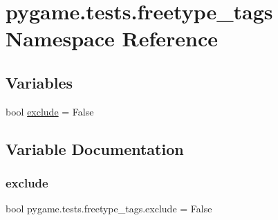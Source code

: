 \hypertarget{namespacepygame_1_1tests_1_1freetype__tags}{}\section{pygame.\+tests.\+freetype\+\_\+tags Namespace Reference}
\label{namespacepygame_1_1tests_1_1freetype__tags}
\subsection*{Variables}
\begin{DoxyCompactItemize}
\item 
bool \hyperlink{namespacepygame_1_1tests_1_1freetype__tags_a9805ff14999bba1c04d6a03278794226}{exclude} = False
\end{DoxyCompactItemize}


\subsection{Variable Documentation}
\mbox{\label{namespacepygame_1_1tests_1_1freetype__tags_a9805ff14999bba1c04d6a03278794226}} 
\subsubsection{\texorpdfstring{exclude}{exclude}}
{\footnotesize\ttfamily bool pygame.\+tests.\+freetype\+\_\+tags.\+exclude = False}

